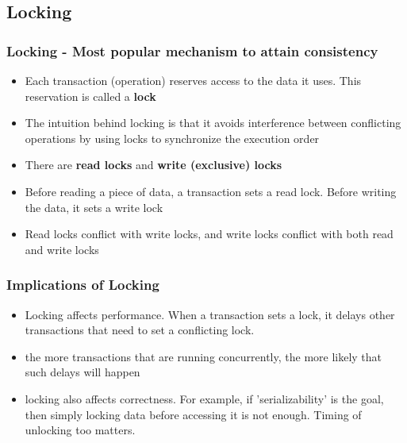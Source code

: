 \documentclass[12]{beamer}
\begin{document}
\subsection{Locking}

\begin{frame}
  \frametitle{Locking - Most popular mechanism to attain consistency}
  \begin{itemize}
     \addtolength{\itemsep}{0.5\baselineskip}
    \item Each transaction (operation) reserves access to the data it uses. This reservation is called a \textbf{lock}
    \item The intuition behind locking is that it avoids interference between conflicting operations by using locks to synchronize the execution order
    \item There are \textbf{read locks} and \textbf{write (exclusive) locks}
    \item Before reading a piece of data, a transaction sets a read lock. Before writing the data, it sets a write lock
    \item Read locks conflict with write locks, and write locks conflict with both read and write locks
  \end{itemize}
\end{frame}

\begin{frame}
  \frametitle{Implications of Locking}
  \begin{itemize}
    \item  Locking affects performance. When a transaction sets a lock, it delays other transactions that need to set a conflicting lock.
    \item the more transactions that are running concurrently, the more likely that such delays will happen
    \item locking also affects correctness. For example, if 'serializability' is the goal, then simply locking data before accessing it is not enough. Timing of unlocking too matters.
  \end{itemize}
\end{frame}
\end{document}
